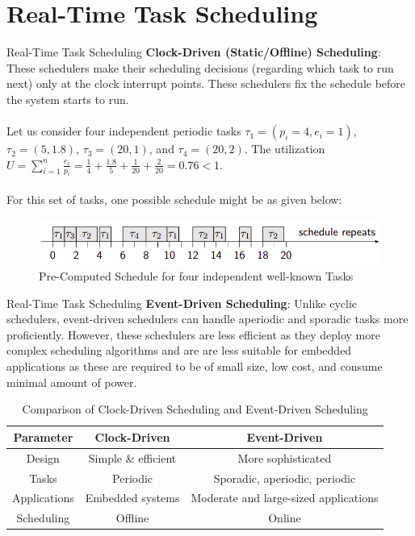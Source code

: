 \documentclass{beamer}
\begin{document}
\section{Real-Time Task Scheduling} 
\begin{frame}{Real-Time Task Scheduling}
\textbf{Clock-Driven (Static/Offline) Scheduling}:  These schedulers make their scheduling decisions (regarding which task to run next) only at the clock interrupt points. These schedulers fix the schedule before the system starts to run.  \\~\\
Let us consider four independent periodic tasks $\tau_1 = (p_i = 4, e_i = 1)$, $\tau_2 = (5, 1.8)$, $\tau_3 = (20, 1)$, and $\tau_4 = (20, 2)$. The  utilization $U =  \sum_{i=1}^{n} \frac{e_i}{p_i} = \frac{1}{4} + \frac{1.8}{5} + \frac{1}{20} + \frac{2}{20} = 0.76 < 1$. \\~\\
For this set of tasks, one possible schedule might be as given below: 
\begin{figure}[h]
    \centering
    \includegraphics[width=\textwidth]{images/cyclic.png}
    \caption{Pre-Computed Schedule for four independent well-known Tasks}
\end{figure}
\end{frame}

\begin{frame}{Real-Time Task Scheduling}
\textbf{Event-Driven Scheduling}: Unlike cyclic schedulers, event-driven schedulers can handle aperiodic and sporadic tasks
more proficiently. However, these schedulers are less efficient as they deploy more complex scheduling algorithms and are are less suitable for embedded applications as these are required to be of small size, low cost, and consume minimal amount of power. 

\begin{table}[h]
\begin{tabular}{|c|c|c|}
 \hline
 \textbf{Parameter} &  \textbf{Clock-Driven} & \textbf{Event-Driven}\\
 \hline  \hline
 Design & Simple \& efficient & More sophisticated \\
 \hline
 Tasks & Periodic & Sporadic, aperiodic, periodic \\
 \hline
 Applications & Embedded systems &  Moderate and
large-sized applications \\ 
 \hline
 Scheduling & Offline & Online \\
 \hline
\end{tabular}
\caption{Comparison of Clock-Driven Scheduling and Event-Driven Scheduling}
\end{table}
\end{frame}
\end{document}
